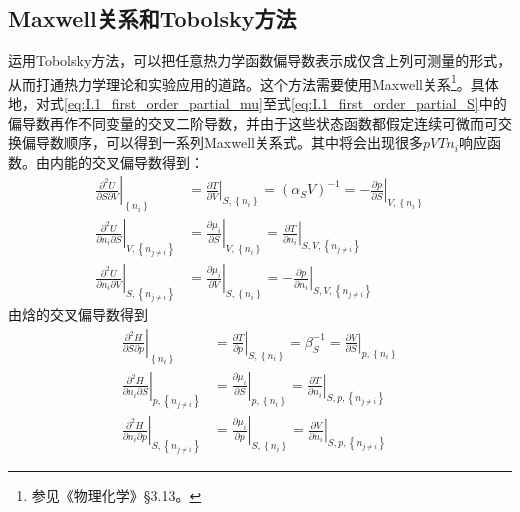 \documentclass[main.tex]{subfiles}
\begin{document}
\subsection{Maxwell关系和Tobolsky方法}
运用Tobolsky方法\cite{Tobolsky1942}，可以把任意热力学函数偏导数表示成仅含上列可测量的形式，从而打通热力学理论和实验应用的道路。这个方法需要使用Maxwell关系\footnote{参见《物理化学》\S 3.13。}。具体地，对式\eqref{eq:I.1_first_order_partial_mu}至式\eqref{eq:I.1_first_order_partial_S}中的偏导数再作不同变量的交叉二阶导数，并由于这些状态函数都假定连续可微而可交换偏导数顺序，可以得到一系列Maxwell关系式。其中将会出现很多$pVTn_i$响应函数。由内能的交叉偏导数得到：
\begin{align}
    \left.\frac{\partial^2 U}{\partial S\partial V}\right|_{\left\{n_i\right\}}             & =\left.\frac{\partial T}{\partial V}\right|_{S,\left\{n_i\right\}}=\left(\alpha_S V\right)^{-1}=-\left.\frac{\partial p}{\partial S}\right|_{V,\left\{n_i\right\}}\label{eq:I.1_Maxwell_USV} \\
    \left.\frac{\partial ^2U}{\partial n_i\partial S}\right|_{V,\left\{n_{j\neq i}\right\}} & =\left.\frac{\partial \mu_i}{\partial S}\right|_{V,\left\{n_i\right\}}=\left.\frac{\partial T}{\partial n_i}\right|_{S,V,\left\{n_{j\neq i}\right\}}\label{eq:I.1_Maxwell_UnS}               \\
    \left.\frac{\partial ^2U}{\partial n_i\partial V}\right|_{S,\left\{n_{j\neq i}\right\}} & =\left.\frac{\partial \mu_i}{\partial V}\right|_{S,\left\{n_i\right\}}=-\left.\frac{\partial p}{\partial n_i}\right|_{S,V,\left\{n_{j\neq i}\right\}}\label{eq:I.1_Maxwell_UnV}
\end{align}
由焓的交叉偏导数得到
\begin{align}
    \left.\frac{\partial^2 H}{\partial S\partial p}\right|_{\left\{n_i\right\}}             & =\left.\frac{\partial T}{\partial p}\right|_{S,\left\{n_i\right\}}=\beta_S^{-1}=\left.\frac{\partial V}{\partial S}\right|_{p,\left\{n_i\right\}}\label{eq:I.1_Maxwell_HSp}    \\
    \left.\frac{\partial ^2H}{\partial n_i\partial S}\right|_{p,\left\{n_{j\neq i}\right\}} & =\left.\frac{\partial \mu_i}{\partial S}\right|_{p,\left\{n_i\right\}}=\left.\frac{\partial T}{\partial n_i}\right|_{S,p,\left\{n_{j\neq i}\right\}}\label{eq:I.1_Maxwell_HnS} \\
    \left.\frac{\partial ^2H}{\partial n_i\partial p}\right|_{S,\left\{n_{j\neq i}\right\}} & =\left.\frac{\partial \mu_i}{\partial p}\right|_{S,\left\{n_i\right\}}=\left.\frac{\partial V}{\partial n_i}\right|_{S,p,\left\{n_{j\neq i}\right\}}\label{eq:I.1_Maxwell_Hnp}
\end{align}
\end{document}
